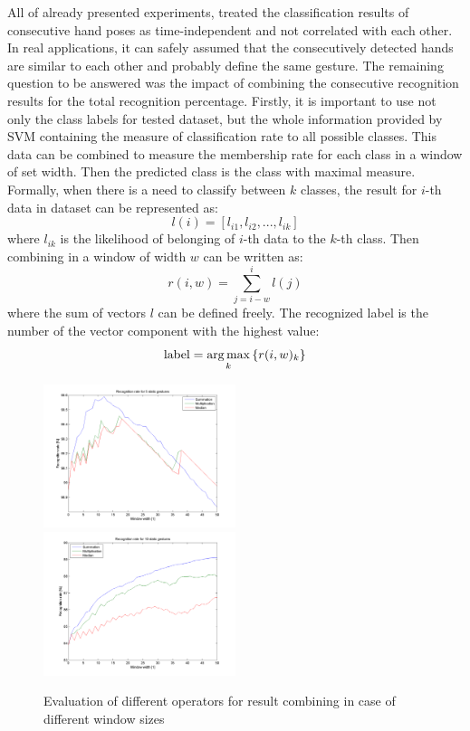 All of already presented experiments, treated the classification results of consecutive hand poses as time-independent and not correlated with each other.
In real applications, it can safely assumed that the consecutively detected hands are similar to each other and probably define the same gesture.
The remaining question to be answered was the impact of combining the consecutive recognition results for the total recognition percentage.
Firstly, it is important to use not only the class labels for tested dataset, but the whole information provided by SVM containing the measure of classification rate to all possible classes.
This data can be combined to measure the membership rate for each class in a window of set width.
Then the predicted class is the class with maximal measure.
Formally, when there is a need to classify between $k$ classes, the result for $i$-th data in dataset can be represented as:
\begin {equation}
l(i) = [l_{i1}, l_{i2}, ..., l_{ik}]
\end{equation}
where $l_{ik}$ is the likelihood of belonging of $i$-th data to the $k$-th class.
Then combining in a window of width $w$ can be written as:
\begin{equation}
r(i,w) = \sum_{j=i-w}^{i}{ l(j) }
\end{equation}
where the sum of vectors $l$ can be defined freely.
The recognized label is the number of the vector component with the highest value:
\begin{equation}
\mathrm{label} = \operatorname*{arg\,max}_{k}{\{r(i,w)_k\}}
\end{equation}


\begin{figure}[htb]
\centering

\centerline{%
 \includegraphics[width=0.5\textwidth]{figures/Mul5.png}
 \includegraphics[width=0.5\textwidth]{figures/Mul10.png}
 }%
 \caption{Evaluation of different operators for result combining in case of different window sizes}
 \label{staticoper}
\end{figure}

